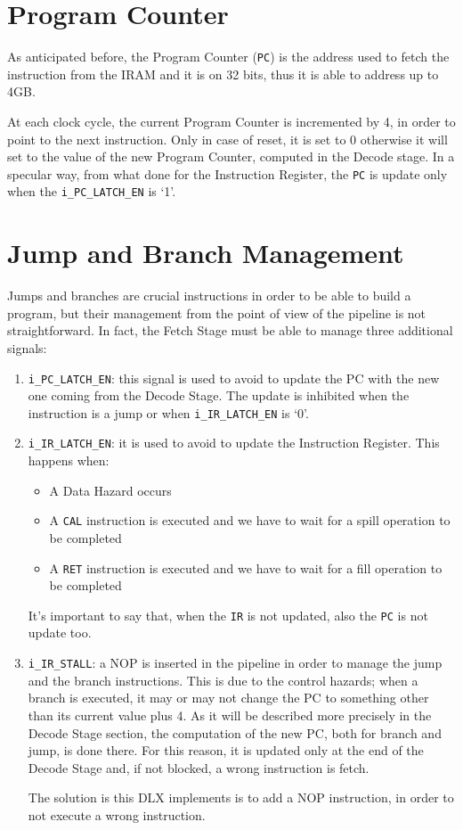 \section{Program Counter}
As anticipated before, the Program Counter (\texttt{PC}) is the address used to fetch the instruction from the IRAM and it is on 32 bits, thus it is able to address up to 4GB.

At each clock cycle, the current Program Counter is incremented by 4, in order to point to the next instruction. Only in case of reset, it is set to 0 otherwise it will set to the value of the new Program Counter, computed in the Decode stage. In a specular way, from what done for the Instruction Register, the \texttt{PC} is update only when the \texttt{i\_PC\_LATCH\_EN} is `1'.

\section{Jump and Branch Management}
\label{sec:jmp_branch}
Jumps and branches are crucial instructions in order to be able to build a program, but their management from the point of view of the pipeline is not straightforward. In fact, the Fetch Stage must be able to manage three additional signals:
\begin{enumerate}
	\item \texttt{i\_PC\_LATCH\_EN}: this signal is used to avoid to update the PC with the new one coming from the Decode Stage. The update is inhibited when the instruction is a jump or when \texttt{i\_IR\_LATCH\_EN} is `0'. 
	\item \texttt{i\_IR\_LATCH\_EN}: it is used to avoid to update the Instruction Register. This happens when:
	\begin{itemize}
		\item A Data Hazard occurs
		\item A \texttt{CAL} instruction is executed and we have to wait for a spill operation to be completed
		\item A \texttt{RET} instruction is executed and we have to wait for a fill operation to be completed
	\end{itemize}
	It's important to say that, when the \texttt{IR} is not updated, also the \texttt{PC} is not update too.
	\item \texttt{i\_IR\_STALL}: a NOP is inserted in the pipeline in order to manage the jump and the branch instructions. This is due to the control hazards; when a branch is executed, it may or may not change the PC to something other than its current value plus 4. As it will be described more precisely in the Decode Stage section, the computation of the new PC, both for branch and jump, is done there. For this reason, it is updated only at the end of the Decode Stage and, if not blocked, a wrong instruction is fetch.
	
	The solution is this DLX implements is to add a NOP instruction, in order to not execute a wrong instruction.
\end{enumerate}